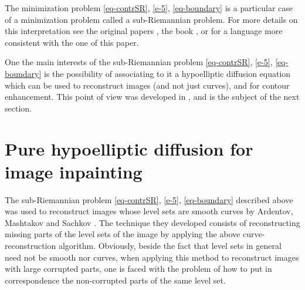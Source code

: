 \documentclass[proc]{edpsmath}
\begin{document}
The minimization problem  \eqref{eq-contrSR}, \eqref{e-5}, \eqref{eq-boundary} is a particular case of a minimization problem called  a sub-Riemannian problem.  For more details on this interpretation see the original papers \cite{citti-sarti,petitot,pinwheel}, the book \cite{petitot-libro}, or
\cite{Boscain2012a,Boscain2014,nostrolibro} for a language more consistent with the one of this paper.

One the main interests of the sub-Riemannian problem  \eqref{eq-contrSR}, \eqref{e-5}, \eqref{eq-boundary} is the possibility of associating to it a hypoelliptic diffusion equation which can be used to reconstruct images (and not just curves),  and for contour enhancement. This point of view was developed in \cite{Boscain2012a,citti-sarti,Duits2008,Duits2010,Duits2010a}, and is the subject of the next section.



\section{Pure hypoelliptic diffusion for image inpainting}\label{s-hypo}

The sub-Riemannian problem
\eqref{eq-contrSR}, \eqref{e-5}, \eqref{eq-boundary}
described above  was used to reconstruct  images whose level sets are smooth curves by Ardentov, Mashtakov and Sachkov \cite{ardentov}. The technique they developed consists of reconstructing missing parts of the level sets of the image by applying the above curve-reconstruction algorithm.
Obviously, beside the fact that level sets in general need not be smooth nor curves, when applying this method to reconstruct images with large corrupted parts, one is faced with the problem of how to put in correspondence the non-corrupted parts of the same level set.
\end{document}
